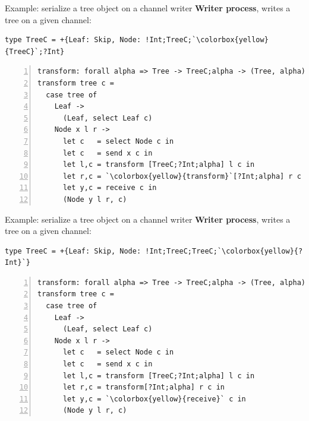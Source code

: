 \documentclass[10pt]{beamer}
\begin{document}
\begin{frame}[fragile]{Example:  serialize a tree object on a channel \hfill{\color{mLightBrown}writer}}
	\textbf{Writer process}, writes a tree on a given channel:
	
\begin{lstlisting}[escapeinside=\`\`]
type TreeC = +{Leaf: Skip, Node: !Int;TreeC;`\colorbox{yellow}{TreeC}`;?Int}
\end{lstlisting}
\begin{lstlisting}[numbers=left, xleftmargin=0.7cm, escapeinside=\`\`]
transform: forall alpha => Tree -> TreeC;alpha -> (Tree, alpha)
transform tree c =
  case tree of
    Leaf ->
      (Leaf, select Leaf c)
    Node x l r ->
      let c   = select Node c in
      let c   = send x c in 
      let l,c = transform [TreeC;?Int;alpha] l c in
      let r,c = `\colorbox{yellow}{transform}`[?Int;alpha] r c in
      let y,c = receive c in
      (Node y l r, c)
\end{lstlisting}
\end{frame}

\begin{frame}[fragile]{Example:  serialize a tree object on a channel \hfill{\color{mLightBrown}writer}}
	\textbf{Writer process}, writes a tree on a given channel:
	
\begin{lstlisting}[escapeinside=\`\`]
type TreeC = +{Leaf: Skip, Node: !Int;TreeC;TreeC;`\colorbox{yellow}{?Int}`}
\end{lstlisting}
\begin{lstlisting}[numbers=left, xleftmargin=0.7cm, escapeinside=\`\`]
transform: forall alpha => Tree -> TreeC;alpha -> (Tree, alpha)
transform tree c =
  case tree of
    Leaf ->
      (Leaf, select Leaf c)
    Node x l r ->
      let c   = select Node c in
      let c   = send x c in 
      let l,c = transform [TreeC;?Int;alpha] l c in
      let r,c = transform[?Int;alpha] r c in
      let y,c = `\colorbox{yellow}{receive}` c in
      (Node y l r, c)
\end{lstlisting}
\end{frame}
\end{document}
